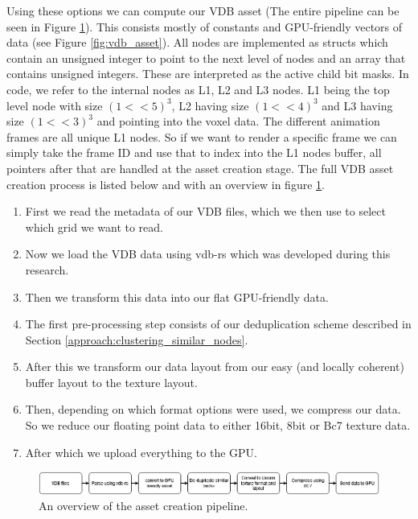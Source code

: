 Using these options we can compute our VDB asset (The entire pipeline can be seen in Figure \ref{fig:vdb_asset_pipeline}). This consists mostly of constants and GPU-friendly vectors of data (see Figure \ref{fig:vdb_asset}). All nodes are implemented as structs which contain an unsigned integer to point to the next level of nodes and an array that contains unsigned integers. These are interpreted as the active child bit masks. In code, we refer to the internal nodes as L1, L2 and L3 nodes. L1 being the top level node with size $(1 << 5)^3$, L2 having size $(1 << 4)^3$ and L3 having size $(1 << 3)^3$ and pointing into the voxel data. The different animation frames are all unique L1 nodes. So if we want to render a specific frame we can simply take the frame ID and use that to index into the L1 nodes buffer, all pointers after that are handled at the asset creation stage. The full VDB asset creation process is listed below and with an overview in figure \ref{fig:vdb_asset_pipeline}.
\begin{enumerate}
    \itemsep0em
    \item First we read the metadata of our VDB files, which we then use to select which grid we want to read.
    \item Now we load the VDB data using vdb-rs \cite{VDBRS} which was developed during this research.
    \item Then we transform this data into our flat GPU-friendly data.
    \item The first pre-processing step consists of our deduplication scheme described in Section \ref{approach:clustering_similar_nodes}.
    \item After this we transform our data layout from our easy (and locally coherent) buffer layout to the texture layout.
    \item Then, depending on which format options were used, we compress our data. So we reduce our floating point data to either 16bit, 8bit or Bc7 texture data.
    \item After which we upload everything to the GPU.
\end{enumerate}

\begin{figure}[H]
    \centering
    \includegraphics[width=0.9\linewidth]{figures/VDB asset pipeline.png}
    \caption{An overview of the asset creation pipeline.}
    \label{fig:vdb_asset_pipeline}
\end{figure}


